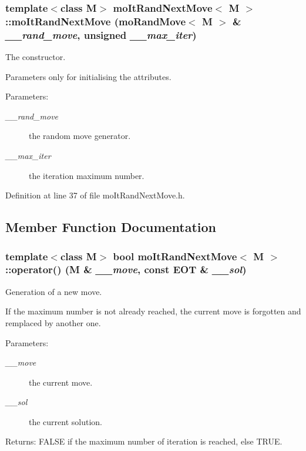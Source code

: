 \subsubsection{\setlength{\rightskip}{0pt plus 5cm}template$<$class M$>$ {\bf mo\-It\-Rand\-Next\-Move}$<$ M $>$::{\bf mo\-It\-Rand\-Next\-Move} ({\bf mo\-Rand\-Move}$<$ M $>$ \& {\em \_\-\_\-rand\_\-move}, unsigned {\em \_\-\_\-max\_\-iter})\hspace{0.3cm}{\tt  [inline]}}\label{classmo_it_rand_next_move_95ed13e1178f4e44cab7184b040b83d7}


The constructor. 

Parameters only for initialising the attributes.

\begin{Desc}
\item[Parameters:]
\begin{description}
\item[{\em \_\-\_\-rand\_\-move}]the random move generator. \item[{\em \_\-\_\-max\_\-iter}]the iteration maximum number. \end{description}
\end{Desc}


Definition at line 37 of file mo\-It\-Rand\-Next\-Move.h.

\subsection{Member Function Documentation}
\subsubsection{\setlength{\rightskip}{0pt plus 5cm}template$<$class M$>$ bool {\bf mo\-It\-Rand\-Next\-Move}$<$ M $>$::operator() (M \& {\em \_\-\_\-move}, const {\bf EOT} \& {\em \_\-\_\-sol})\hspace{0.3cm}{\tt  [inline]}}\label{classmo_it_rand_next_move_92a2fbbc02a20853b9a309e99018a102}


Generation of a new move. 

If the maximum number is not already reached, the current move is forgotten and remplaced by another one.

\begin{Desc}
\item[Parameters:]
\begin{description}
\item[{\em \_\-\_\-move}]the current move. \item[{\em \_\-\_\-sol}]the current solution. \end{description}
\end{Desc}
\begin{Desc}
\item[Returns:]FALSE if the maximum number of iteration is reached, else TRUE. \end{Desc}


